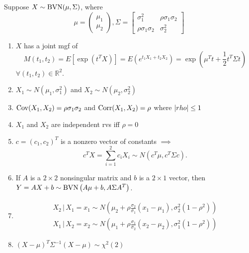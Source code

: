 \documentclass[notoc,notitlepage]{tufte-book}
\begin{document}
\begin{propo}
\label{propo:properties_of_bivariate_normal_distribution}
  Suppose $X \sim \operatorname{BVN}(\mu, \Sigma)$, where
  \begin{equation*}
    \mu = \begin{pmatrix}
      \mu_1 \\ \mu_2
    \end{pmatrix},
    \Sigma = \begin{bmatrix}
      \sigma_1^2 & \rho \sigma_1 \sigma_2 \\
      \rho \sigma_1 \sigma_2 & \sigma_2^2
    \end{bmatrix}
  \end{equation*}
  \begin{enumerate}
    \item $X$ has a joint mgf of
      \begin{equation*}
        M(t_1, t_2) = E[ \exp\left( t^T X \right) ] = E\left( e^{t_1 X_1 + t_2 X_2} \right) = \exp\left( \mu^T t + \frac{1}{2} t^T \Sigma t \right)
      \end{equation*}
      $\forall (t_1, t_2) \in \mathbb{R}^2$.

    \item $X_1 \sim N(\mu_1, \sigma_1^2)$ and $X_2 \sim N(\mu_2, \sigma_2^2)$
    \item $\operatorname{Cov}(X_1, X_2) = \rho \sigma_1 \sigma_2$ and $\operatorname{Corr}(X_1, X_2) = \rho$ where $\left|rho\right| \leq 1$
    \item $X_1$ and $X_2$ are independent rvs iff $\rho = 0$
    \item $c = (c_1, c_2)^T$ is a nonzero vector of constants $\implies$
      \begin{equation*}
        c^T X = \sum_{i=1}^{2} c_i X_i \sim N \left( c^T \mu, c^T \Sigma c \right).
      \end{equation*}
    \item If $A$ is a $2 \times 2$ nonsingular matrix and $b$ is a $2 \times 1$ vector, then $Y = AX + b \sim \operatorname{BVN}\left( A\mu + b, A \Sigma A^T \right)$.
    \item
      \begin{gather*}
        X_2 \, | \, X_1 = x_1 \sim N \left( \mu_2 + \rho \frac{\sigma_2}{\sigma_1}( x_1 - \mu_1 ), \sigma_2^2 (1 - \rho^2) \right) \\
        X_1 \, | \, X_2 = x_2 \sim N \left( \mu_1 + \rho \frac{\sigma_1}{\sigma_2}( x_2 - \mu_2 ), \sigma_1^2 (1 - \rho^2) \right)
      \end{gather*}

    \item $(X - \mu)^T \Sigma^{-1} (X - \mu) \sim \chi^2 (2)$
  \end{enumerate}
\end{propo}
\end{document}
